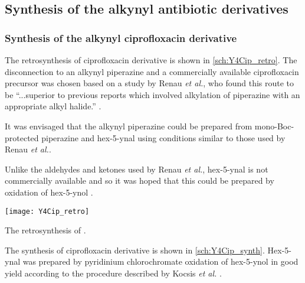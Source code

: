 \subsection{Synthesis of the alkynyl antibiotic derivatives}

\subsubsection{Synthesis of the alkynyl ciprofloxacin derivative \label{sec:Y4Cip}}

The retrosynthesis of ciprofloxacin derivative  is shown in \ref{sch:Y4Cip_retro}. The disconnection to an alkynyl piperazine  and a commercially available ciprofloxacin precursor  was chosen based on a study by Renau \textit{et al.}, who found this route to be ``...superior to previous reports which involved alkylation of piperazine with an appropriate alkyl halide.'' \cite{Renau1996,JPS:JPS2600571210}. 

It was envisaged that the alkynyl piperazine  could be prepared from mono-Boc-protected piperazine  and hex-5-ynal  using conditions similar to those used by Renau \textit{et al.}\cite{Renau1996}.

Unlike the aldehydes and ketones used by Renau \textit{et al.}\cite{Renau1996}, hex-5-ynal  is not commercially available and so it was hoped that this could be prepared by oxidation of hex-5-ynol .


\begin{scheme}[H]
	\begin{center}
		\texttt{[image: Y4Cip\_retro]}
		\caption{The retrosynthesis of . \label{sch:Y4Cip_retro}}
	\end{center}
\end{scheme}


The synthesis of ciprofloxacin derivative  is shown in \ref{sch:Y4Cip_synth}. Hex-5-ynal  was prepared by pyridinium chlorochromate oxidation of hex-5-ynol  in good yield according to the procedure described by Kocsis \textit{et al.} \cite{Kocsis2012}. 

